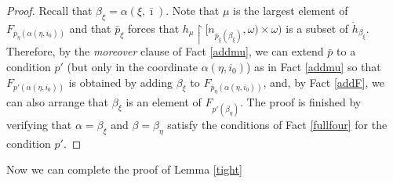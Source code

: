 \documentclass{amsart}
\theoremstyle{definition}
\theoremstyle{remark}
\begin{document}
\begin{proof}
  Recall that $\beta_\xi = \alpha(\xi, \bar\imath)$.
Note that $\mu$ is the largest element of $F_{\bar p_\eta(\alpha(\eta,i_0))}$
and that $\bar p_\xi$ forces that
     $ h_\mu\restriction [n_{\bar p_\xi(\beta_\xi)},\omega)
     \times\omega)$ is a subset of $\dot h_{\beta_\xi}$.     
     Therefore, by the \textit{moreover} clause of Fact \ref{addmu},
     we can extend $\bar p $ 
     to a condition $p'$ (but only in the coordinate
      $\alpha(\eta,i_0)$) as in Fact \ref{addmu} so
      that $F_{p'(\alpha(\eta,i_0))}$ is obtained
      by   adding  $\beta_\xi$ to $F_{\bar p_\eta(\alpha(\eta,i_0))}$,
      and, by Fact \ref{addF}, we can also arrange
      that $\beta_\xi $ is an element
      of $F_{  p' (\beta_\eta)}$. 
      The proof is finished by verifying
      that $\alpha  = \beta_\xi $ and $\beta = \beta_\eta$
      satisfy the conditions of Fact \ref{fullfour} for
      the condition $p'$.
         \end{proof}

Now we can complete the proof of Lemma \ref{tight}

\bgroup

\def\proofname{Proof of Lemma \ref{tight}}
\end{document}
